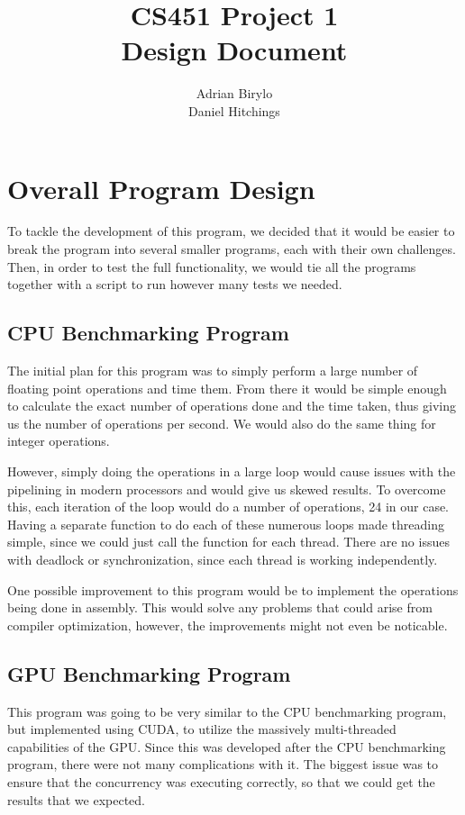 \documentclass{article}
\title{CS451 Project 1 \\ Design Document}
\author{Adrian Birylo \\ Daniel Hitchings}
\begin{document}
\maketitle
\bigskip 

\section{Overall Program Design}
To tackle the development of this program, we decided that it would be easier to break the program into several smaller programs, each with their own challenges.  Then, in order to test the full functionality, we would tie all the programs together with a script to run however many tests we needed.
\subsection{CPU Benchmarking Program}
The initial plan for this program was to simply perform a large number of floating point operations and time them.  From there it would be simple enough to calculate the exact number of operations done and the time taken, thus giving us the number of operations per second.  We would also do the same thing for integer operations.

However, simply doing the operations in a large loop would cause issues with the pipelining in modern processors and would give us skewed results.  To overcome this, each iteration of the loop would do a number of operations, 24 in our case.  Having a separate function to do each of these numerous loops made threading simple, since we could just call the function for each thread.  There are no issues with deadlock or synchronization, since each thread is working independently.

One possible improvement to this program would be to implement the operations being done in assembly.  This would solve any problems that could arise from compiler optimization, however, the improvements might not even be noticable.

\subsection{GPU Benchmarking Program}
This program was going to be very similar to the CPU benchmarking program, but implemented using CUDA, to utilize the massively multi-threaded capabilities of the GPU.  Since this was developed after the CPU benchmarking program, there were not many complications with it.  The biggest issue was to ensure that the concurrency was executing correctly, so that we could get the results that we expected.
\end{document}
